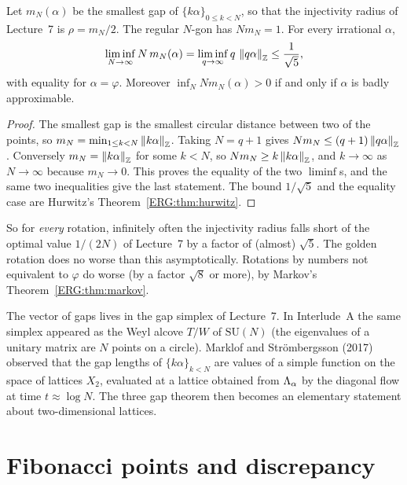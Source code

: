 \begin{proposition}\label{ERG:prop:spread}
Let $m_N(\alpha)$ be the smallest gap of $\{k\alpha\}_{0\le k<N}$, so that the injectivity radius of
Lecture~7 is $\rho=m_N/2$. The regular $N$-gon has $Nm_N=1$. For every irrational $\alpha$,
\[
  \liminf_{N\to\infty}N\,m_N(\alpha)=\liminf_{q\to\infty}q\,\left\lVert q\alpha \right\rVert_{\mathbb{Z}}\le\frac1{\sqrt5},
\]
with equality for $\alpha=\varphi$. Moreover $\inf_NNm_N(\alpha)>0$ if and only if $\alpha$ is badly
approximable.
\end{proposition}

\begin{proof}
The smallest gap is the smallest circular distance between two of the points, so
$m_N=\min_{1\le k<N}\left\lVert k\alpha \right\rVert_{\mathbb{Z}}$. Taking $N=q+1$ gives
$Nm_N\le(q+1)\left\lVert q\alpha \right\rVert_{\mathbb{Z}}$. Conversely $m_N=\left\lVert k\alpha \right\rVert_{\mathbb{Z}}$ for some $k<N$, so
$Nm_N\ge k\left\lVert k\alpha \right\rVert_{\mathbb{Z}}$, and $k\to\infty$ as $N\to\infty$ because $m_N\to0$. This proves the
equality of the two $\liminf$s, and the same two inequalities give the last statement. The bound
$1/\sqrt5$ and the equality case are Hurwitz's Theorem~\ref{ERG:thm:hurwitz}.
\end{proof}

So for \emph{every} rotation, infinitely often the injectivity radius falls short of the optimal value
$1/(2N)$ of Lecture~7 by a factor of (almost) $\sqrt5$. The golden rotation does no worse than this
asymptotically. Rotations by numbers not equivalent to $\varphi$ do worse (by a factor $\sqrt8$ or
more), by Markov's Theorem~\ref{ERG:thm:markov}.

\begin{remark}
The vector of gaps lives in the gap simplex of Lecture~7. In Interlude~A the same simplex appeared as
the Weyl alcove $T/W$ of $\mathrm{SU}(N)$ (the eigenvalues of a unitary matrix are $N$ points on a
circle). Marklof and Str\"ombergsson (2017) observed that the gap lengths of $\{k\alpha\}_{k<N}$ are
values of a simple function on the space of lattices $X_2$, evaluated at a lattice obtained from
$\Lambda_\alpha$ by the diagonal flow at time $t\approx\log N$. The three gap theorem then becomes an elementary
statement about two-dimensional lattices.
\end{remark}

\section{Fibonacci points and discrepancy}
\label{ERG:sec:fib}

